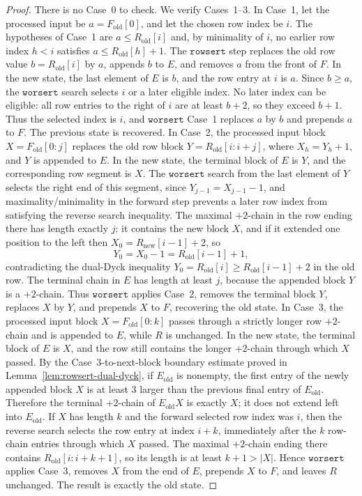 \documentclass[11pt]{article}
\theoremstyle{plain}
\theoremstyle{definition}
\theoremstyle{remark}
\newcommand{\rowsert}{\texttt{rowsert}}
\newcommand{\worsert}{\texttt{worsert}}
\begin{document}
\begin{proof}
There is no Case~0 to check.  We verify Cases~1--3.
In Case~1, let the processed input be \(a=F_{\mathrm{old}}[0]\), and let the
chosen row index be \(i\).  The hypotheses of Case~1 are \(a\le R_{\mathrm{old}}[i]\)
and, by minimality of \(i\), no earlier row index \(h<i\) satisfies
\(a\le R_{\mathrm{old}}[h]+1\).  The \(\rowsert\) step replaces the old row value
\(b=R_{\mathrm{old}}[i]\) by \(a\), appends \(b\) to \(E\), and removes \(a\) from
the front of \(F\).  In the new state, the last element of \(E\) is \(b\), and
the row entry at \(i\) is \(a\).  Since \(b\ge a\), the \(\worsert\)
search selects \(i\) or a later eligible index.  No later index can be eligible:
all row entries to the right of \(i\) are at least \(b+2\), so they exceed \(b+1\).
Thus the selected index is \(i\), and \(\worsert\) Case~1 replaces \(a\) by \(b\)
and prepends \(a\) to \(F\).  The previous state is recovered.
In Case~2, the processed input block \(X=F_{\mathrm{old}}[0:j]\) replaces the
old row block \(Y=R_{\mathrm{old}}[i:i+j]\), where \(X_h=Y_h+1\), and \(Y\) is
appended to \(E\).  In the new state, the terminal block of \(E\) is \(Y\), and
the corresponding row segment is \(X\).  The \(\worsert\) search from
the last element of \(Y\) selects the right end of this segment, since
\(Y_{j-1}=X_{j-1}-1\), and maximality/minimality in the forward step prevents a
later row index from satisfying the reverse search inequality.  The maximal
\(+2\)-chain in the row ending there has length exactly \(j\): it contains the
new block \(X\), and if it extended one position to the left then
\(X_0=R_{\mathrm{new}}[i-1]+2\), so
\[
  Y_0=X_0-1=R_{\mathrm{old}}[i-1]+1,
\]
contradicting the dual-Dyck inequality
\(Y_0=R_{\mathrm{old}}[i]\ge R_{\mathrm{old}}[i-1]+2\) in the old row.  The
terminal chain in \(E\) has length at least \(j\), because the appended block
\(Y\) is a \(+2\)-chain.  Thus \(\worsert\) applies Case~2, removes the terminal
block \(Y\), replaces \(X\) by \(Y\), and prepends \(X\) to \(F\), recovering the
old state.
In Case~3, the processed input block \(X=F_{\mathrm{old}}[0:k]\) passes through
a strictly longer row \(+2\)-chain and is appended to \(E\), while \(R\) is
unchanged.  In the new state, the terminal block of \(E\) is \(X\), and the row
still contains the longer \(+2\)-chain through which \(X\) passed.  By the
Case~3-to-next-block boundary estimate proved in
Lemma~\ref{lem:rowsert-dual-dyck}, if \(E_{\mathrm{old}}\) is nonempty, the
first entry of the newly appended block \(X\) is at least \(3\) larger than the
previous final entry of \(E_{\mathrm{old}}\).
Therefore the terminal \(+2\)-chain of \(E_{\mathrm{old}}X\) is exactly \(X\); it
does not extend left into \(E_{\mathrm{old}}\).  If \(X\) has length \(k\) and
the forward selected row index was \(i\), then the reverse search selects the
row entry at index \(i+k\), immediately after the \(k\) row-chain entries
through which \(X\) passed.  The maximal \(+2\)-chain ending there contains
\(R_{\mathrm{old}}[i:i+k+1]\), so its length is at least \(k+1>|X|\).
Hence \(\worsert\) applies Case~3, removes \(X\) from the end of \(E\), prepends
\(X\) to \(F\), and leaves \(R\) unchanged.  The result is exactly the old state.
\end{proof}
\end{document}
